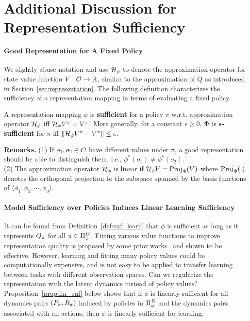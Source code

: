 
\section{Additional Discussion for Representation Sufficiency}
\label{app:repre}

\paragraph{Good Representation for A Fixed Policy} We slightly abuse notation and use $\mathcal{H}_{\phi}$ to denote the approximation operator for state value function $V:\mathcal{O}\to\mathbb{R}$, similar to the approximation of $Q$ as introduced in Section~\ref{sec:representation}. The following definition characterizes the sufficiency of a representation mapping in terms of evaluating a fixed policy. 
\begin{definition}
\label{def:suf_policy}
A representation mapping $\phi$ is \textbf{sufficient} for a policy $\pi$ w.r.t. approximation operator $\mathcal{H}_{\phi}$ iff $\mathcal{H}_{\phi} V^\pi = V^\pi$. More generally, for a constant $\epsilon \geq 0$, $\Phi$ is $\boldsymbol{\epsilon}$\textbf{-sufficient} for $\pi$ iff $\|\mathcal{H}_{\phi} V^\pi - V^\pi\| \leq \epsilon$.
\end{definition}

\textbf{Remarks.} 
(1) If $o_1, o_2 \in\mathcal{O}$ have different values under $\pi$, a good representation should be able to distinguish them, i.e., $\phi^*(o_1)\neq \phi^*(o_2)$. \\
(2) The approximation operator $\mathcal{H}_{\phi}$ is linear if $\mathcal{H}_{\phi} V = \mathrm{Proj}_{\Phi} (V)$ where $\mathrm{Proj}_\Phi(\cdot)$ denotes the orthogonal projection to the subspace spanned by the basis functions of $\langle \phi_1, \phi_2, \cdots, \phi_d \rangle$.


\paragraph{Model Sufficiency over Policies Induces Linear Learning Sufficiency}
It can be found from Definition~\ref{def:suf_learn} that $\phi$ is sufficient as long as it represents $Q_\pi$ for all $\pi\in\Pi_{\phi}^D$. Fitting various value functions to improve representation quality is proposed by some prior works~\cite{bellemare2019geometric,dabney2020the} and shown to be effective. However, learning and fitting many policy values could be computationally expensive, and is not easy to be applied to transfer learning between tasks with different observation spaces. Can we regularize the representation with the latent dynamics instead of policy values?
Proposition~\ref{prop:lin_suf} below shows that if $\phi$ is linearly sufficient for all dynamics pairs $(P_\pi, R_\pi)$ induced by policies in $\Pi_{\phi}^D$ and the dynamics pairs associated with all actions, then $\phi$ is linearly sufficient for learning. 

